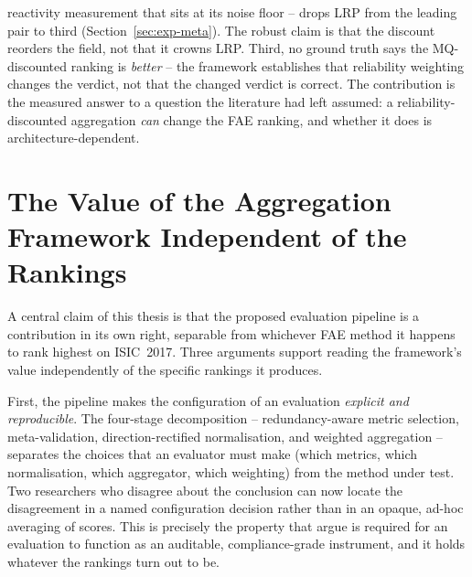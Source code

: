 \begin{itemize}
    reactivity measurement that sits at its noise floor -- drops LRP from the
    leading pair to third (Section~\ref{sec:exp-meta}). The robust claim is
    that the discount reorders the field, not that it crowns LRP. Third, no
    ground truth says the MQ-discounted ranking is \emph{better} -- the
    framework establishes that reliability weighting changes the verdict, not
    that the changed verdict is correct. The contribution is the measured
    answer to a question the literature had left assumed: a
    reliability-discounted aggregation \emph{can} change the FAE ranking, and
    whether it does is architecture-dependent.
\end{itemize}

\section{The Value of the Aggregation Framework Independent of the Rankings}
\label{sec:disc-framework-value}

A central claim of this thesis is that the proposed evaluation pipeline is a
contribution in its own right, separable from whichever FAE method it happens
to rank highest on ISIC~2017. Three arguments support reading the framework's
value independently of the specific rankings it produces.

First, the pipeline makes the configuration of an evaluation \emph{explicit and
reproducible}. The four-stage decomposition -- redundancy-aware metric
selection, meta-validation, direction-rectified normalisation, and weighted
aggregation -- separates the choices that an evaluator must make (which metrics,
which normalisation, which aggregator, which weighting) from the method under
test. Two researchers who disagree about the conclusion can now locate the
disagreement in a named configuration decision rather than in an opaque,
ad-hoc averaging of scores. This is precisely the property that
\citet{seth2025bridging} argue is required for an evaluation to function as
an auditable, compliance-grade instrument, and it holds whatever the rankings
turn out to be.

